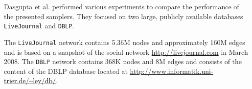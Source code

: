 Dasgupta et al. \cite{dasgupta2012social} performed various experiments to compare the performance of the presented samplers.
They focused on two large, publicly available databases \texttt{LiveJournal} and \texttt{DBLP}.

The \texttt{LiveJournal} network contains 5.36M nodes and approximately 160M edges and is based on a snapshot of the social network \url{http://livejournal.com} in March 2008.
The \texttt{DBLP} network contains 368K nodes and 8M edges and consists of the content of the DBLP database located at \url{http://www.informatik.uni-trier.de/~ley/db/}.

